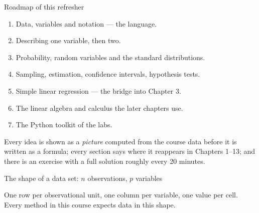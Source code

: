 \documentclass[aspectratio=169,11pt]{beamer}
\begin{document}
\begin{frame}{Roadmap of this refresher}
  \begin{takeaway}
    \begin{enumerate}
      \item Data, variables and notation --- the language.
      \item Describing one variable, then two.
      \item Probability, random variables and the standard distributions.
      \item Sampling, estimation, confidence intervals, hypothesis tests.
      \item Simple linear regression --- the bridge into Chapter 3.
      \item The linear algebra and calculus the later chapters use.
      \item The Python toolkit of the labs.
    \end{enumerate}
  \end{takeaway}
  \footnotesize
  Every idea is shown as a \emph{picture} computed from the course data before
  it is written as a formula; every section says where it reappears in
  Chapters 1--13; and there is an exercise with a full solution roughly every
  20 minutes.
\end{frame}

\begin{frame}{The shape of a data set: $n$ observations, $p$ variables}
  \begin{center}
  \end{center}
  \begin{takeaway}
    One row per observational unit, one column per variable, one value per
    cell. Every method in this course expects data in this shape.
  \end{takeaway}
\end{frame}
\end{document}
